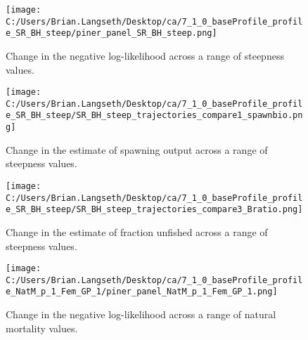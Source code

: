 \documentclass[11pt,
  english,
  a4paper,
]{article}
\begin{document}
\begin{figure}
\centering
\texttt{[image: C:/Users/Brian.Langseth/Desktop/ca/7\_1\_0\_baseProfile\_profile\_SR\_BH\_steep/piner\_panel\_SR\_BH\_steep.png]}
\caption{Change in the negative log-likelihood across a range of steepness values.\label{fig:h-profile}}
\end{figure}

\tagmcend\tagstructend


\begin{figure}
\centering
\texttt{[image: C:/Users/Brian.Langseth/Desktop/ca/7\_1\_0\_baseProfile\_profile\_SR\_BH\_steep/SR\_BH\_steep\_trajectories\_compare1\_spawnbio.png]}
\caption{Change in the estimate of spawning output across a range of steepness values.\label{fig:h-ssb}}
\end{figure}

\tagmcend\tagstructend


\begin{figure}
\centering
\texttt{[image: C:/Users/Brian.Langseth/Desktop/ca/7\_1\_0\_baseProfile\_profile\_SR\_BH\_steep/SR\_BH\_steep\_trajectories\_compare3\_Bratio.png]}
\caption{Change in the estimate of fraction unfished across a range of steepness values.\label{fig:h-depl}}
\end{figure}

\tagmcend\tagstructend


\begin{figure}
\centering
\texttt{[image: C:/Users/Brian.Langseth/Desktop/ca/7\_1\_0\_baseProfile\_profile\_NatM\_p\_1\_Fem\_GP\_1/piner\_panel\_NatM\_p\_1\_Fem\_GP\_1.png]}
\caption{Change in the negative log-likelihood across a range of natural mortality values.\label{fig:m-profile}}
\end{figure}

\tagmcend\tagstructend

\end{document}
